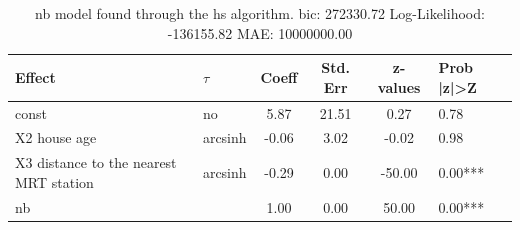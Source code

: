 \begin{table}
	\caption{nb model found through the hs algorithm. bic: 272330.72 Log-Likelihood: -136155.82 MAE: 10000000.00}
	\begin{center}
		\begin{tabular}{|l|l|c|c|c|l|}
			\hline
			Effect & $\tau$ & Coeff & Std. Err & z-values & Prob |z|>Z \\
			\hline
			const & no & 5.87 & 21.51 & 0.27 & 0.78 \\
			\hline
			X2 house age & arcsinh & -0.06 & 3.02 & -0.02 & 0.98 \\
			\hline
			X3 distance to the nearest MRT station & arcsinh & -0.29 & 0.00 & -50.00 & 0.00*** \\
			\hline
			nb &  & 1.00 & 0.00 & 50.00 & 0.00*** \\
			\hline
		\end{tabular}
	\end{center}
\end{table}